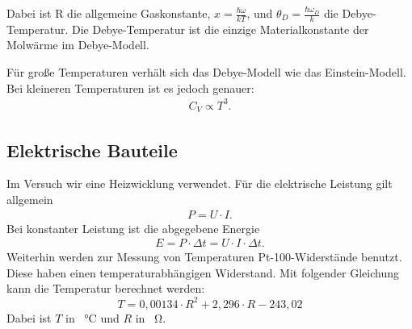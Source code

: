Dabei ist R die allgemeine Gaskonstante, $x = \frac{\hbar \omega}{kT}$, und $\theta_D = \frac{\hbar \omega_D}{k}$ die Debye-Temperatur.
Die Debye-Temperatur ist die einzige Materialkonstante der Molwärme im Debye-Modell.

Für große Temperaturen verhält sich das Debye-Modell wie das Einstein-Modell.
Bei kleineren Temperaturen ist es jedoch genauer:
\begin{align}
	C_V \propto T^3.
\end{align}

\subsection{Elektrische Bauteile}
Im Versuch wir eine Heizwicklung verwendet.
Für die elektrische Leistung gilt allgemein
\begin{align}
	P = U \cdot I.
\end{align}
Bei konstanter Leistung ist die abgegebene Energie
\begin{align}
	\label{eenergie}
	E = P \cdot \Delta t = U \cdot I \cdot \Delta t.
\end{align}
Weiterhin werden zur Messung von Temperaturen Pt-100-Widerstände benutzt.
Diese haben einen temperaturabhängigen Widerstand.
Mit folgender Gleichung\cite{v47} kann die Temperatur berechnet werden:
\begin{equation}
	\label{pt100}
	T=0,00134\cdot R^2+2,296\cdot R-243,02
\end{equation}
Dabei ist $T$ in \SI{}{\celsius} und $R$ in \SI{}{\ohm}.